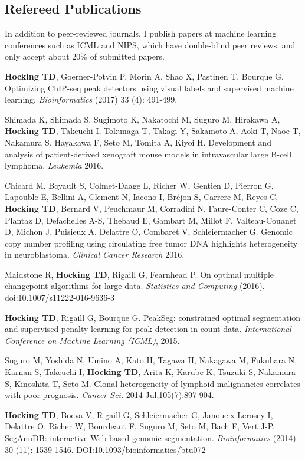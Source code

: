 \documentclass[margin,line]{res}
\begin{document}
\begin{resume}
\section{\sc Refereed Publications}

In addition to peer-reviewed journals, I publish papers at
machine learning conferences such as ICML and NIPS, which have
double-blind peer reviews, and only accept about 20\% of submitted
papers.

{\bf Hocking TD}, Goerner-Potvin P, Morin A, Shao X, Pastinen T,
Bourque G. Optimizing ChIP-seq peak detectors using visual labels and
supervised machine learning. {\it Bioinformatics} (2017) 33 (4): 491-499.

Shimada K, Shimada S, Sugimoto K, Nakatochi M, Suguro M, Hirakawa A,
{\bf Hocking TD}, Takeuchi I, Tokunaga T, Takagi Y, Sakamoto A, Aoki T, Naoe
T, Nakamura S, Hayakawa F, Seto M, Tomita A, Kiyoi H. Development and
analysis of patient-derived xenograft mouse models in intravascular
large B-cell lymphoma. {\it Leukemia} 2016.

Chicard M, Boyault S, Colmet-Daage L, Richer W, Gentien D, Pierron G,
Lapouble E, Bellini A, Clement N, Iacono I, Bréjon S, Carrere M, Reyes
C, {\bf Hocking TD}, Bernard V, Peuchmaur M, Corradini N, Faure-Conter
C, Coze C, Plantaz D, Defachelles A-S, Thebaud E, Gambart M, Millot F,
Valteau-Couanet D, Michon J, Puisieux A, Delattre O, Combaret V,
Schleiermacher G. Genomic copy number profiling using circulating free
tumor DNA highlights heterogeneity in neuroblastoma. {\it Clinical Cancer
Research} 2016.

Maidstone R, {\bf Hocking TD}, Rigaill G, Fearnhead P. On optimal
multiple changepoint algorithms for large data. {\it Statistics and
Computing} (2016). doi:10.1007/s11222-016-9636-3 

{\bf Hocking TD}, Rigaill G, Bourque G. PeakSeg: constrained optimal
segmentation and supervised penalty learning for peak detection in
count data. {\it International Conference on Machine Learning (ICML)},
2015.

Suguro M, Yoshida N, Umino A, Kato H, Tagawa H, Nakagawa M, Fukuhara
N, Karnan S, Takeuchi I, {\bf Hocking TD}, Arita K, Karube K, Tsuzuki
S, Nakamura S, Kinoshita T, Seto M. Clonal heterogeneity of lymphoid
malignancies correlates with poor prognosis. {\it Cancer Sci.} 2014
Jul;105(7):897-904.

{\bf Hocking TD}, Boeva V, Rigaill G, Schleiermacher G,
Janoueix-Lerosey I, Delattre O, Richer W, Bourdeaut F, Suguro M, Seto
M, Bach F, Vert J-P. SegAnnDB: interactive Web-based genomic
segmentation. {\it Bioinformatics} (2014) 30 (11):
1539-1546. DOI:10.1093/bioinformatics/btu072


\end{resume}
\end{document}

